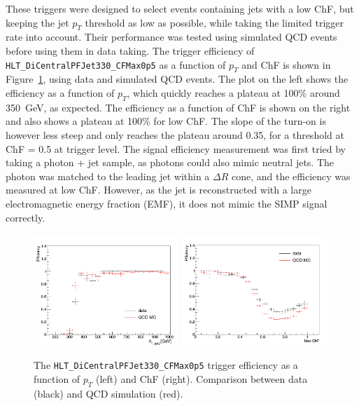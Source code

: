 These triggers were designed to select events containing jets with a low ChF, but keeping the jet $p_T$ threshold as low as possible, while taking the limited trigger rate into account. Their performance was tested using simulated \ac{QCD} events before using them in data taking. The trigger efficiency of \texttt{HLT\_DiCentralPFJet330\_CFMax0p5} as a function of $p_{T}$ and ChF is shown in Figure~\ref{fig:efficiencies_qcd_data}, using data and simulated \ac{QCD} events. The plot on the left shows the efficiency as a function of $p_T$, which quickly reaches a plateau at 100\% around \SI{350}{GeV}, as expected. The efficiency as a function of ChF is shown on the right and also shows a plateau at 100\% for low ChF. The slope of the turn-on is however less steep and only reaches the plateau around 0.35, for a threshold at ChF = 0.5 at trigger level. The signal efficiency measurement was first tried by taking a photon + jet sample, as photons could also mimic neutral jets. The photon was matched to the leading jet within a $\Delta R$ cone, and the efficiency was measured at low ChF. However, as the jet is reconstructed with a large electromagnetic energy fraction (EMF), it does not mimic the \ac{SIMP} signal correctly. 

\begin{figure}[ht]
  \centering
  \includegraphics[width=0.49\textwidth]{figures/trigger/pt_eff_05_DataMC.png}\hfill%
  \includegraphics[width=0.49\textwidth]{figures/trigger/chf_eff_05_DataMC.png}
  \caption{The \texttt{HLT\_DiCentralPFJet330\_CFMax0p5} trigger efficiency as a function of $p_{T}$ (left) and ChF (right). Comparison between data (black) and \ac{QCD} simulation (red). }
  \label{fig:efficiencies_qcd_data}
\end{figure}

